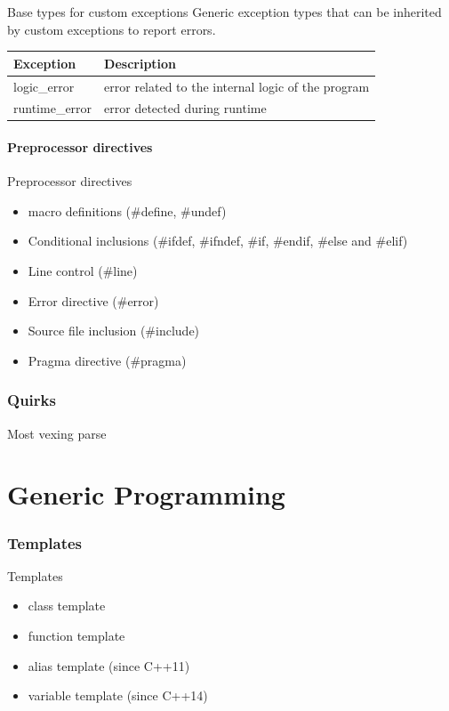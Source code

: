 \documentclass{beamer}
\begin{document}
\begin{frame}{Base types for custom exceptions}
Generic exception types that can be inherited by custom exceptions to report
errors.
\begin{table}
\begin{tabular}{l | l }
Exception & Description \\
\hline
logic\_error & error related to the internal logic of the program \\
runtime\_error & error detected during runtime
\end{tabular}
\end{table}
\end{frame}

\subsection{Preprocessor directives}
\begin{frame}{Preprocessor directives}
\begin{itemize}
  \item macro definitions (\#define, \#undef)
  \item Conditional inclusions (\#ifdef, \#ifndef, \#if, \#endif, \#else and \#elif)
  \item Line control (\#line)
  \item Error directive (\#error)
  \item Source file inclusion (\#include)
  \item Pragma directive (\#pragma)
\end{itemize}
\end{frame}

\section{Quirks}

\begin{frame}{Most vexing parse}
\end{frame}


\part{Generic Programming}

\section{Templates}
\begin{frame}{Templates}
\begin{itemize}
  \item class template
  \item function template
  \item alias template (since C++11)
  \item variable template (since C++14)
\end{itemize}
\end{frame}
\end{document}
